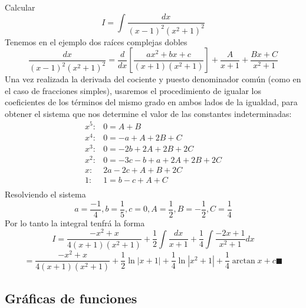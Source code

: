 \documentclass[10pt,twoside]{SelfArx} %
\begin{document}
\begin{ejemplo}
	Calcular
	\begin{equation}
	I=\displaystyle\int\dfrac{dx}{(x-1)^{2}(x^{2}+1)^{2}}
	\end{equation}
	Tenemos en el ejemplo dos raíces complejas dobles
	\begin{equation}
	\dfrac{dx}{(x-1)^{2}(x^{2}+1)^{2}}=\dfrac{d}{dx}\left [\dfrac{ax^{2}+bx+c}{(x+1)(x^{2}+1)}\right ]+\dfrac{A}{x+1}+\dfrac{Bx+C}{x^{2}+1}
	\end{equation}
	Una vez realizada la derivada del cociente y puesto denominador común
	(como en el caso de fracciones simples), usaremos el procedimiento de
	igualar los coeficientes de los términos del mismo grado en ambos lados de
	la igualdad, para obtener el sistema que nos determine el valor de las
	constantes indeterminadas:
	\[ 
	\begin{array}{cc}
	x^{5}:& 0=A+B\\
	x^{4}:& 0=-a+A+2B+C\\
	x^{3}:& 0=-2b+2A+2B+2C\\
	x^{2}:& 0=-3c-b+a+2A+2B+2C\\
	x: & 2a-2c+A+B+2C\\
	1:& 1=b-c+A+C\\
	\end{array}
	 \]
	 Resolviendo el sistema
	 \[ a=\dfrac{-1}{4}, b=\dfrac{1}{5}, c=0, A=\dfrac{1}{2}, B=-\dfrac{1}{2}, C=\dfrac{1}{4} \]
	 Por lo tanto la integral tenfrá la forma
	 \begin{equation}
	 I=\displaystyle\dfrac{-x^{2}+x}{4(x+1)(x^{2}+1)}+\dfrac{1}{2}\int\dfrac{dx}{x+1}+\dfrac{1}{4}\int\dfrac{-2x+1}{x^{2}+1}dx
	 \end{equation}
	 \begin{equation}
	 =\displaystyle\dfrac{-x^{2}+x}{4(x+1)(x^{2}+1)}+\dfrac{1}{2}\ln|x+1|+\dfrac{1}{4}\ln |x^{2}+1|+\dfrac{1}{4}\arctan x+c\blacksquare
	 \end{equation}
\end{ejemplo}








\newpage
\subsection{Gráficas de funciones}
\end{document}
